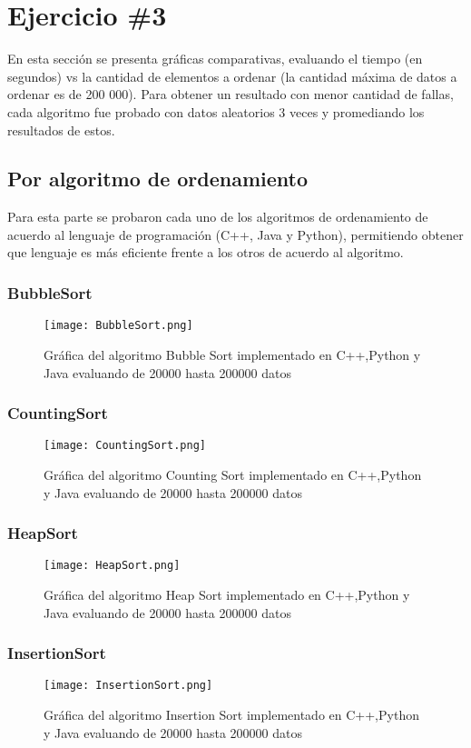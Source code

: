 \section*{Ejercicio \#3}
En esta sección se presenta gráficas comparativas, evaluando el tiempo (en segundos) vs la cantidad de elementos a ordenar (la cantidad máxima de datos a ordenar es de 200 000). Para obtener un resultado con menor cantidad de fallas, cada algoritmo fue probado con datos aleatorios 3 veces y promediando los resultados de estos.
\subsection*{Por algoritmo de ordenamiento}
Para esta parte se probaron cada uno de los algoritmos de ordenamiento de acuerdo al lenguaje de programación (C++, Java y Python), permitiendo obtener que lenguaje es más eficiente frente a los otros de acuerdo al algoritmo.

\subsubsection*{BubbleSort}
\begin{figure}[H]
	   \centering
	   \texttt{[image: BubbleSort.png]}
	   \label{imgBubble}
	   \caption{Gráfica del algoritmo Bubble Sort implementado en C++,Python y Java evaluando de 20000 hasta 200000 datos}
\end{figure}

\subsubsection*{CountingSort}
\begin{figure}[H]
	   \centering
	   \texttt{[image: CountingSort.png]}
	   \caption{Gráfica del algoritmo Counting Sort implementado en C++,Python y Java evaluando de 20000 hasta 200000 datos}
\end{figure}
\subsubsection*{HeapSort}
\begin{figure}[H]
	   \centering
	   \texttt{[image: HeapSort.png]}
	   \caption{Gráfica del algoritmo Heap Sort implementado en C++,Python y Java evaluando de 20000 hasta 200000 datos}
\end{figure}
\subsubsection*{InsertionSort}
\begin{figure}[H]
	   \centering
	   \texttt{[image: InsertionSort.png]}
	   \caption{Gráfica del algoritmo Insertion Sort implementado en C++,Python y Java evaluando de 20000 hasta 200000 datos}
\end{figure}
